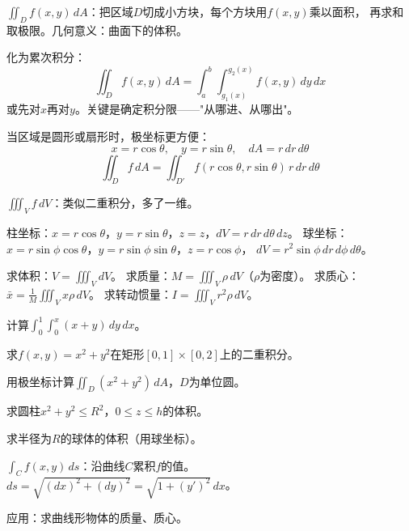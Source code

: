 \documentclass[a4paper,12pt]{ctexart}
\begin{document}

$\iint_D f(x,y)\,dA$：把区域$D$切成小方块，每个方块用$f(x,y)$乘以面积，
再求和取极限。几何意义：曲面下的体积。


化为累次积分：
\[
\iint_D f(x,y)\,dA = \int_a^b\int_{g_1(x)}^{g_2(x)} f(x,y)\,dy\,dx
\]
或先对$x$再对$y$。关键是确定积分限——"从哪进、从哪出"。


当区域是圆形或扇形时，极坐标更方便：
\[
x=r\cos\theta,\quad y=r\sin\theta,\quad dA = r\,dr\,d\theta
\]
\[
\iint_D f\,dA = \iint_{D'} f(r\cos\theta,r\sin\theta)\,r\,dr\,d\theta
\]


$\iiint_V f\,dV$：类似二重积分，多了一维。

柱坐标：$x=r\cos\theta$，$y=r\sin\theta$，$z=z$，$dV=r\,dr\,d\theta\,dz$。
球坐标：$x=r\sin\phi\cos\theta$，$y=r\sin\phi\sin\theta$，$z=r\cos\phi$，
$dV=r^2\sin\phi\,dr\,d\phi\,d\theta$。


求体积：$V=\iiint_V dV$。
求质量：$M=\iiint_V \rho\,dV$（$\rho$为密度）。
求质心：$\bar x = \frac1M\iiint_V x\rho\,dV$。
求转动惯量：$I=\iiint_V r^2\rho\,dV$。


\begin{exercise}
\item 计算$\int_0^1\int_0^x (x+y)\,dy\,dx$。
\item 求$f(x,y)=x^2+y^2$在矩形$[0,1]\times[0,2]$上的二重积分。
\item 用极坐标计算$\iint_D (x^2+y^2)\,dA$，$D$为单位圆。
\item 求圆柱$x^2+y^2\le R^2$，$0\le z\le h$的体积。
\item 求半径为$R$的球体的体积（用球坐标）。
\end{exercise}

\newpage



$\int_C f(x,y)\,ds$：沿曲线$C$累积$f$的值。
$ds=\sqrt{(dx)^2+(dy)^2}=\sqrt{1+(y')^2}\,dx$。

应用：求曲线形物体的质量、质心。

\end{document}
